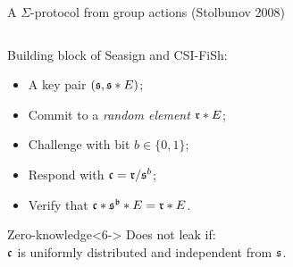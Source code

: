 \documentclass[aspectratio=169]{beamer}
\begin{document}

\begin{frame}{A $\Sigma$-protocol from group actions \small(Stolbunov 2008)}
  \begin{columns}
    \begin{column}{0.55\textwidth}
      Building block of Seasign and CSI-FiSh:

      \medskip
      \begin{itemize}
      \item<1-> A key pair \emph{$(\frak{s}, \frak{s}*E)$};
      \item<2-> Commit to a \emph{random element $\frak{r}*E$};
      \item<3-> Challenge with bit \emph{$b\in\{0,1\}$};
      \item<4-> Respond with \emph{$\frak{c} = \frak{r}/\frak{s}^b$};
      \item<5-> Verify that \emph{$\frak{c}*\frak{s^b}*E = \frak{r}*E$}.
      \end{itemize}

      \begin{block}{Zero-knowledge}<6->
        \centering
        Does not leak if:\\
        \alert{$\frak{c}$ is uniformly distributed} and independent from $\frak{s}$.
      \end{block}

    \end{column}  
    \begin{column}{0.40\textwidth}
      \centering
    \end{column}  
  \end{columns}
\end{frame}

\end{document}
